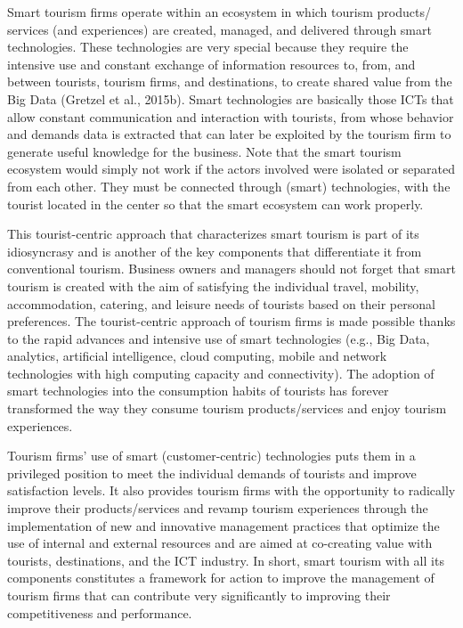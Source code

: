 \documentclass[
  letterpaper,
  DIV=11,
  numbers=noendperiod]{scrreprt}
\begin{document}
Smart tourism firms operate within an ecosystem in which tourism
products/ services (and experiences) are created, managed, and delivered
through smart technologies. These technologies are very special because
they require the intensive use and constant exchange of information
resources to, from, and between tourists, tourism firms, and
destinations, to create shared value from the Big Data (Gretzel et al.,
2015b). Smart technologies are basically those ICTs that allow constant
communication and interaction with tourists, from whose behavior and
demands data is extracted that can later be exploited by the tourism
firm to generate useful knowledge for the business. Note that the smart
tourism ecosystem would simply not work if the actors involved were
isolated or separated from each other. They must be connected through
(smart) technologies, with the tourist located in the center so that the
smart ecosystem can work properly.

This tourist-centric approach that characterizes smart tourism is part
of its idiosyncrasy and is another of the key components that
differentiate it from conventional tourism. Business owners and managers
should not forget that smart tourism is created with the aim of
satisfying the individual travel, mobility, accommodation, catering, and
leisure needs of tourists based on their personal preferences. The
tourist-centric approach of tourism firms is made possible thanks to the
rapid advances and intensive use of smart technologies (e.g., Big Data,
analytics, artificial intelligence, cloud computing, mobile and network
technologies with high computing capacity and connectivity). The
adoption of smart technologies into the consumption habits of tourists
has forever transformed the way they consume tourism products/services
and enjoy tourism experiences.

Tourism firms' use of smart (customer-centric) technologies puts them in
a privileged position to meet the individual demands of tourists and
improve satisfaction levels. It also provides tourism firms with the
opportunity to radically improve their products/services and revamp
tourism experiences through the implementation of new and innovative
management practices that optimize the use of internal and external
resources and are aimed at co-creating value with tourists,
destinations, and the ICT industry. In short, smart tourism with all its
components constitutes a framework for action to improve the management
of tourism firms that can contribute very significantly to improving
their competitiveness and performance.
\end{document}
